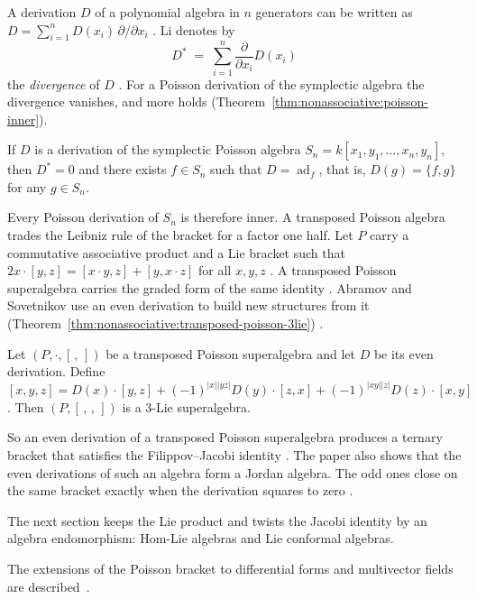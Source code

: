 A derivation $D$ of a polynomial algebra in $n$ generators can be written
as $D=\sum_{i=1}^{n}D(x_i)\,\partial/\partial x_i$
\cite[p.~657]{AlbertiArestiLi2018Poisson}. Li denotes by
\[
D^{\ast}\;=\;\sum_{i=1}^{n}\frac{\partial}{\partial x_i}D(x_i)
\]
the \emph{divergence} of $D$ \cite[p.~658]{AlbertiArestiLi2018Poisson}.
For a
Poisson derivation of the symplectic algebra the divergence vanishes, and
more holds (Theorem~\ref{thm:nonassociative:poisson-inner}).

\begin{theorem}
\label{thm:nonassociative:poisson-inner}
If $D$ is a derivation of the symplectic Poisson algebra
$S_n=k[x_1,y_1,\dots,x_n,y_n]$, then $D^{\ast}=0$ and there exists
$f\in S_n$ such that $D=\operatorname{ad}_f$, that is, $D(g)=\{f,g\}$ for
any $g\in S_n$.
\end{theorem}

Every Poisson derivation of $S_n$ is therefore inner. A transposed Poisson
algebra trades the Leibniz rule of the bracket for a factor one half. Let $P$
carry a commutative associative product and a Lie bracket such that
$2x\cdot[y,z]=[x\cdot y,z]+[y,x\cdot z]$ for all $x,y,z$
\cite[equation~(12), p.~489]{AbramovSovetnikov2025}. A transposed Poisson
superalgebra carries the graded form of the same identity
\cite[Definition~2.1, p.~490]{AbramovSovetnikov2025}. Abramov and Sovetnikov use
an even derivation to build new structures from it (Theorem~\ref{thm:nonassociative:transposed-poisson-3lie})
\cite[p.~487]{AbramovSovetnikov2025}.\begin{theorem}\label{thm:nonassociative:transposed-poisson-3lie}
Let $(P,\cdot,[\,,\,])$ be a transposed Poisson superalgebra and let $D$ be its
even derivation. Define
$[x,y,z]=D(x)\cdot[y,z]+(-1)^{|x||yz|}D(y)\cdot[z,x]+(-1)^{|xy||z|}D(z)\cdot[x,y]$.
Then $(P,[\,,\,,\,])$ is a 3-Lie superalgebra.
\end{theorem}

So an even derivation of a transposed Poisson superalgebra produces a ternary
bracket that satisfies the Filippov--Jacobi identity
\cite[p.~495]{AbramovSovetnikov2025}. The paper also shows that the even
derivations of such an algebra form a Jordan algebra. The odd ones close on the
same bracket exactly when the derivation squares to zero
\cite[Theorem~2, p.~492]{AbramovSovetnikov2025}.

The next section keeps
the Lie product and twists the Jacobi identity by an algebra endomorphism:
Hom-Lie algebras and Lie conformal algebras. %

The extensions of the Poisson bracket to differential forms and multivector fields are described~\cite{WlExtensionsOfThePoissonBracketT2020}.
